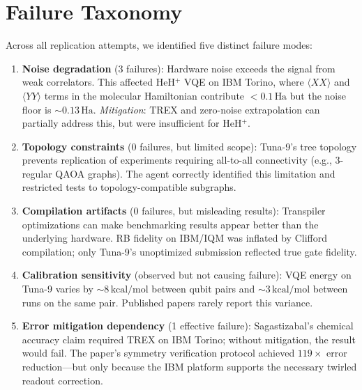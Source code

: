 \documentclass[twocolumn,prl,superscriptaddress,nofootinbib]{revtex4-2}
\newcommand{\Ha}{\,\text{Ha}}
\newcommand{\kcalmol}{\,\text{kcal/mol}}
\begin{document}
\section{Failure Taxonomy}
\label{sec:failures}

Across all replication attempts, we identified five distinct failure modes:

\begin{enumerate}
  \item \textbf{Noise degradation} (3 failures): Hardware noise exceeds the signal from weak correlators.
  This affected HeH$^+$ VQE on IBM Torino, where $\langle XX \rangle$ and $\langle YY \rangle$ terms in the molecular Hamiltonian contribute $< 0.1\Ha$ but the noise floor is $\sim 0.13\Ha$.
  \emph{Mitigation}: TREX and zero-noise extrapolation can partially address this, but were insufficient for HeH$^+$.

  \item \textbf{Topology constraints} (0 failures, but limited scope): Tuna-9's tree topology prevents replication of experiments requiring all-to-all connectivity (e.g., 3-regular QAOA graphs).
  The agent correctly identified this limitation and restricted tests to topology-compatible subgraphs.

  \item \textbf{Compilation artifacts} (0 failures, but misleading results): Transpiler optimizations can make benchmarking results appear better than the underlying hardware.
  RB fidelity on IBM/IQM was inflated by Clifford compilation; only Tuna-9's unoptimized submission reflected true gate fidelity.

  \item \textbf{Calibration sensitivity} (observed but not causing failure): VQE energy on Tuna-9 varies by $\sim$8$\kcalmol$ between qubit pairs and $\sim$3$\kcalmol$ between runs on the same pair.
  Published papers rarely report this variance.

  \item \textbf{Error mitigation dependency} (1 effective failure): Sagastizabal's chemical accuracy claim required TREX on IBM Torino; without mitigation, the result would fail.
  The paper's symmetry verification protocol achieved $119\times$ error reduction---but only because the IBM platform supports the necessary twirled readout correction.
\end{enumerate}
\end{document}
